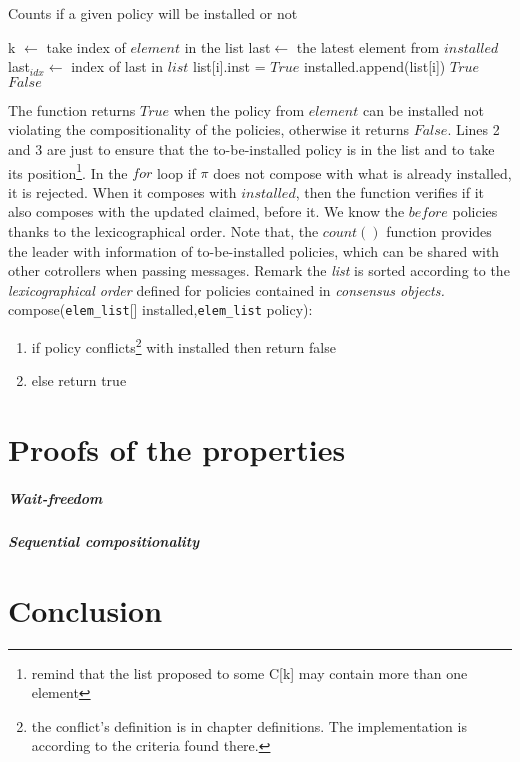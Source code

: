 \documentclass{article}
\begin{document}
\begin{algorithm}
\caption{Counts if a given policy will be installed or not}
\begin{algorithmic}[1]
		\State k $\gets$ take index of $element$ in the list
	\EndIf
		\State last$\gets$ the latest element from $installed$
		\State last$_{idx}\gets$ index of last in $list$
				\State list[i].inst = $True$
				\State installed.append(list[i])
			\EndIf	
		\EndFor		
		 \Return $True$
		\EndIf
	\EndIf			
	\State\Return $False$
	\EndProcedure
\end{algorithmic}
\end{algorithm}
The function returns $True$ when the policy from $element$ can be installed not violating the compositionality of the policies, otherwise it returns $False$. Lines 2 and 3 are just to ensure that the to-be-installed policy is in the list and to take its position\footnote{remind that the list proposed to some C[k] may contain more than one element}. In the $for$ loop if $\pi$ does not compose with what is already installed, it is rejected. When it composes with $installed$, then the function verifies if it also composes with the updated claimed, before it. We know the $before$ policies thanks to the lexicographical order. Note that, the $count()$ function provides the leader with information of to-be-installed policies, which can be shared with other cotrollers when passing messages. 
Remark the \emph{list} is sorted according to the \emph{lexicographical order} defined for policies contained in \emph{consensus objects.} \\

compose(\texttt{elem\_list}[] installed,\texttt{elem\_list} policy):
\begin{enumerate}
\item if policy conflicts\footnote{the conflict's definition is in chapter definitions. The implementation is according to the criteria found there.} with installed then return false
\item else return true
\end{enumerate} 
\section{Proofs of the properties}
\subparagraph{Wait-freedom}
\subparagraph{Sequential compositionality}
%
%
\section{Conclusion}


\end{document}
